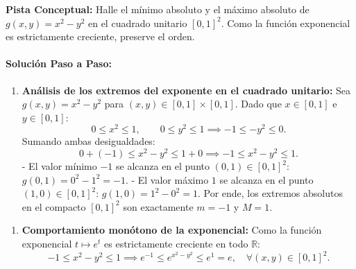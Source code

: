 \documentclass[11pt,a4paper]{article}
\begin{document}
\begin{tcolorbox}[colback=yellow!4,colframe=accentamber!70,arc=1mm,boxrule=0.5pt,left=3mm,right=3mm,top=1.5mm,bottom=1.5mm]
\textbf{Pista Conceptual:} Halle el mínimo absoluto y el máximo absoluto de $g(x,y) = x^2 - y^2$ en el cuadrado unitario $[0,1]^2$. Como la función exponencial es estrictamente creciente, preserve el orden.
\end{tcolorbox}

\paragraph{Solución Paso a Paso:}\par
\begin{enumerate}[label=\textbf{\arabic*.}]
\item \textbf{Análisis de los extremos del exponente en el cuadrado unitario:}
Sea $g(x,y) = x^2 - y^2$ para $(x,y) \in [0,1] \times [0,1]$.
Dado que $x \in [0,1]$ e $y \in [0,1]$:
\begin{equation*}
0 \le x^2 \le 1, \qquad 0 \le y^2 \le 1 \implies -1 \le -y^2 \le 0.
\end{equation*}
Sumando ambas desigualdades:
\begin{equation*}
0 + (-1) \le x^2 - y^2 \le 1 + 0 \implies -1 \le x^2 - y^2 \le 1.
\end{equation*}
- El valor mínimo $-1$ se alcanza en el punto $(0, 1) \in [0,1]^2$: $g(0,1) = 0^2 - 1^2 = -1$.
- El valor máximo $1$ se alcanza en el punto $(1, 0) \in [0,1]^2$: $g(1,0) = 1^2 - 0^2 = 1$.
Por ende, los extremos absolutos en el compacto $[0,1]^2$ son exactamente $m = -1$ y $M = 1$.
\end{enumerate}

\begin{enumerate}[label=\textbf{\arabic*.}]
\item \textbf{Comportamiento monótono de la exponencial:}
Como la función exponencial $t \mapsto e^t$ es estrictamente creciente en todo $\mathbb{R}$:
\begin{equation*}
-1 \le x^2 - y^2 \le 1 \implies e^{-1} \le e^{x^2 - y^2} \le e^1 = e, \quad \forall (x,y) \in [0,1]^2.
\end{equation*}
\end{enumerate}
\end{document}
